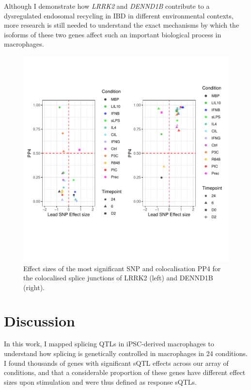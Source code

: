 Although I demonstrate how \textit{LRRK2} and \textit{DENND1B} contribute to a dysregulated endosomal recycling in IBD in different environmental contexts, more research is still needed to understand the exact mechanisms by which the isoforms of these two genes affect such an important biological process in macrophages. \\
\begin{figure}[H]
  \centering
  \includegraphics[width=1.0\textwidth]{lrrk2_dennd1b}
  \vspace{-70pt}
  \caption[Effect sizes and $PP_{4}$ values for \textit{LRRK2} and \textit{DENND1B}]{Effect sizes of the most significant SNP and colocalisation PP4 for the colocalised splice junctions of LRRK2 (left) and DENND1B (right).}
  \label{fig:lrrk2_dennd1b}   
\end{figure}


\newpage
\section{Discussion}

In this work, I mapped splicing QTLs in iPSC-derived macrophages to understand how splicing is genetically controlled in macrophages in 24 conditions. I found thousands of genes with significant sQTL effects across our array of conditions, and that a considerable proportion of these genes have different effect sizes upon stimulation and were thus defined as response sQTLs.\\

